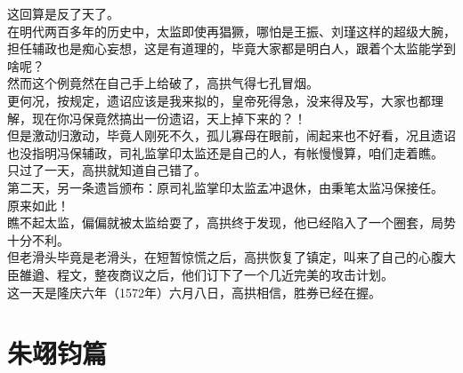 \begin{multicols}{\theparacolNo}
这回算是反了天了。\\

在明代两百多年的历史中，太监即使再猖獗，哪怕是王振、刘瑾这样的超级大腕，担任辅政也是痴心妄想，这是有道理的，毕竟大家都是明白人，跟着个太监能学到啥呢？\\

然而这个例竟然在自己手上给破了，高拱气得七孔冒烟。\\

更何况，按规定，遗诏应该是我来拟的，皇帝死得急，没来得及写，大家也都理解，现在你冯保竟然搞出一份遗诏，天上掉下来的？！\\

但是激动归激动，毕竟人刚死不久，孤儿寡母在眼前，闹起来也不好看，况且遗诏也没指明冯保辅政，司礼监掌印太监还是自己的人，有帐慢慢算，咱们走着瞧。\\

只过了一天，高拱就知道自己错了。\\

第二天，另一条遗旨颁布：原司礼监掌印太监孟冲退休，由秉笔太监冯保接任。\\

原来如此！\\

瞧不起太监，偏偏就被太监给耍了，高拱终于发现，他已经陷入了一个圈套，局势十分不利。\\

但老滑头毕竟是老滑头，在短暂惊慌之后，高拱恢复了镇定，叫来了自己的心腹大臣雒遒、程文，整夜商议之后，他们订下了一个几近完美的攻击计划。\\

这一天是隆庆六年（1572年）六月八日，高拱相信，胜券已经在握。\\
\ifnum{}
	\end{multicols}
\fi
\newpage

\chapter*{朱翊钧篇}
